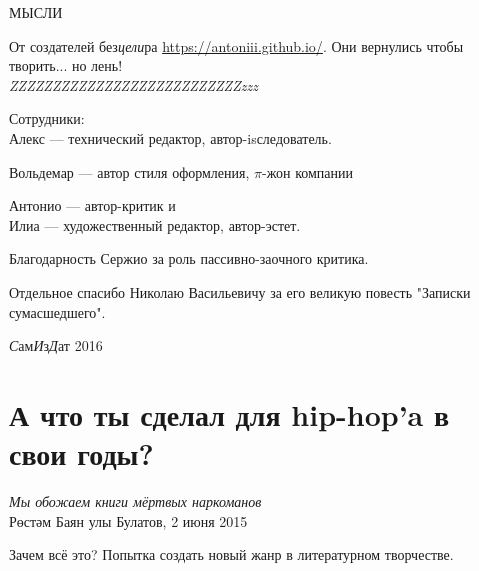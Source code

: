 \documentclass[12pt,a4paper]{article}
\author{pine alive}
\begin{document}
\begin{titlepage}

\vspace*{\fill}
\begin{center}
\Huge МЫСЛИ
\end{center}
\vspace*{\fill}
\end{titlepage}

\begin{titlepage}
    От создателей без\emph{цели}ра \href{100 идей для стартапа}{https://antoniii.github.io/}. 
    Они вернулись чтобы творить... но лень!\\

    \emph{\Huge{ZZZ}\LARGE{ZZZ}\Large{ZZZ}\large{ZZZ}ZZZ\small{ZZZ}\footnotesize{ZZZ}\scriptsize{ZZZ}\tiny{ZZZ}\tiny{zzz}}
\end{titlepage}

\begin{center}
\end{center}
\newpage

\begin{center}
Сотрудники:\\
Алекс --- технический редактор, автор-isследователь.\\\vspace{1em}

Вольдемар --- автор стиля оформления, \( \pi\text{-жон} \) компании\\\vspace{1em}

Антонио --- автор-критик и \\Илиа --- художественный редактор, автор-эстет.\\
\end{center}


Благодарность Сержио за роль пассивно-заочного критика. 


Отдельное спасибо Николаю Васильевичу за его великую повесть "Записки сумасшедшего".
\vfill
\begin{center}
\textit{С}ам\textit{И}з\textit{Д}ат 2016
\end{center}
\newpage
\section*{А что ты сделал для hip-hop'a в свои годы?}\label{section:one}
\begin{displayquote}
\begin{flushright}
    \textit{Мы обожаем книги мёртвых наркоманов}\\
    Рөстәм Баян улы Булатов, 2 июня 2015
\end{flushright}
\end{displayquote}
Зачем всё это? Попытка создать новый жанр в литературном творчестве.
\end{document}
